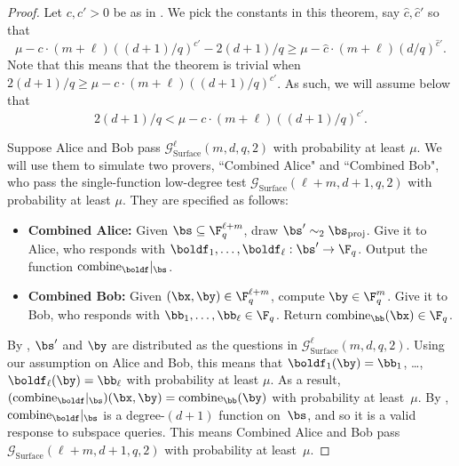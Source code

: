 \documentclass[11pt]{article}
\newcommand{\game}{\mathscr{G}}
\begin{document}
\begin{proof}
Let $c, c' > 0$ be as in .
We pick the constants in this theorem, say $\hat{c}, \hat{c}'$  so that
\begin{equation*}
\mu - c \cdot (m + \ell) ((d+1)/q)^{c'} - 2(d+1)/q \geq \mu - \hat{c} \cdot (m + \ell) (d/q)^{\hat{c}'}.
\end{equation*}
Note that this means that the theorem is trivial when $2(d+1)/q \geq  \mu - c \cdot (m + \ell) ((d+1)/q)^{c'}$.
As such, we will assume below that
\begin{equation}\label{eq:really-technical}
2(d+1)/q <  \mu - c \cdot (m + \ell) ((d+1)/q)^{c'}.
\end{equation}

Suppose Alice and Bob pass $\game_{\mathrm{Surface}}^\ell(m, d, q,2)$ with probability at least $\mu$.
We will use them to simulate two provers, ``Combined Alice" and ``Combined Bob", who pass
the single-function low-degree test $\game_{\mathrm{Surface}}(\ell + m, d+1, q,2)$ with probability at least $\mu$.
They are specified as follows:
\begin{itemize}
\item[$\circ$] \textbf{Combined Alice:} Given $\bs \subseteq \F_q^{\ell + m}$, draw $\bs' \sim_2 \bs_{\mathrm{proj}}$.  Give it to Alice, who responds with $\boldf_1, \ldots, \boldf_{\ell}: \bs' \rightarrow \F_q$.  Output the function $\mathrm{combine}_{\boldf}|_{\bs}$.
\item[$\circ$] \textbf{Combined Bob:} Given $(\bx, \by) \in \F_q^{\ell + m}$, compute $\by \in \F_q^m$. Give it to Bob, who responds with $\bb_1, \ldots, \bb_\ell \in \F_q$.
			Return $\mathrm{combine}_{\bb}(\bx) \in \F_q$.
\end{itemize}
By , $\bs'$ and $\by$ are distributed as the questions in $\game_{\mathrm{Surface}}^\ell(m, d, q,2)$.
Using our assumption on Alice and Bob, this means that $\boldf_1(\by) = \bb_1$, \ldots, $\boldf_\ell(\by) = \bb_\ell$ with probability at least $\mu$.
As a result, $(\mathrm{combine}_{\boldf}|_{\bs})(\bx, \by) = \mathrm{combine}_{\bb}(\by)$ with probability at least~$\mu$.
By , $\mathrm{combine}_{\boldf}|_{\bs}$ is a degree-$(d+1)$ function on~$\bs$,
and so it is a valid response to subspace queries.
This means Combined Alice and Bob pass~$\game_{\mathrm{Surface}}(\ell + m, d+1, q,2)$ with probability at least~$\mu$.


\end{proof}
\end{document}
